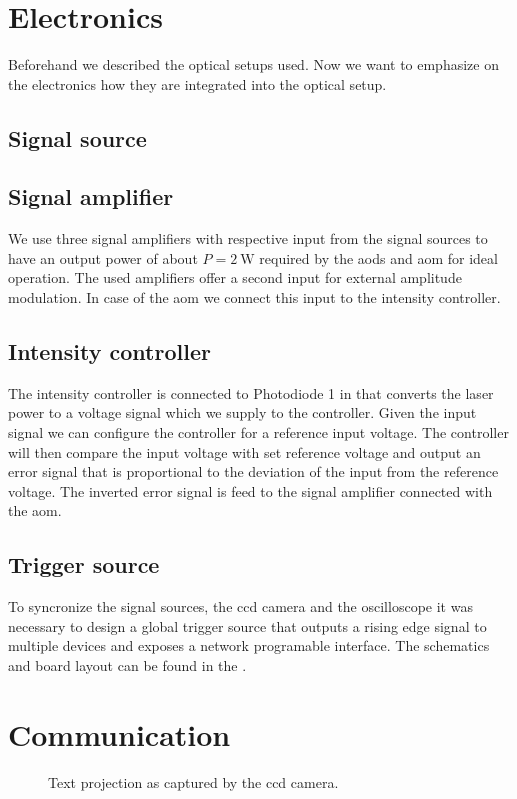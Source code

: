 \section{Electronics}

Beforehand we described the optical setups used. Now we want to emphasize
on the electronics how they are integrated into the optical setup.

\subsection{Signal source}\label{subsec:setup_signal_source}

\subsection{Signal amplifier}

We use three signal amplifiers with respective input from the signal sources
to have an output power of about $P=\SI{2}{\watt}$ required by the \gls{aod}s
and \gls{aom} for ideal operation. The used amplifiers offer a second input
for external amplitude modulation. In case of the \gls{aom} we connect this
input to the intensity controller.

\subsection{Intensity controller}

The intensity controller is connected to Photodiode \num{1} in
 that converts the laser power to a voltage
signal which we supply to the controller. Given the input signal we can
configure the controller for a reference input voltage. The controller will
then compare the input voltage with set reference voltage and output an error
signal that is proportional to the deviation of the input from the reference
voltage. The inverted error signal is feed to the signal amplifier connected
with the \gls{aom}.

\subsection{Trigger source}

To syncronize the signal sources, the \gls{ccd} camera and the oscilloscope
it was necessary to design a global trigger source that outputs a rising edge
signal to multiple devices and exposes a network programable interface.
The schematics and board layout can be found in the
.

\section{Communication}

\begin{figure}[htb]
  \centering
  \begin{adjustbox}{width=\textwidth}
  \end{adjustbox}
  \caption{Text projection as captured by the \gls{ccd} camera.
  }\label{fig:setup_projection}
\end{figure}
